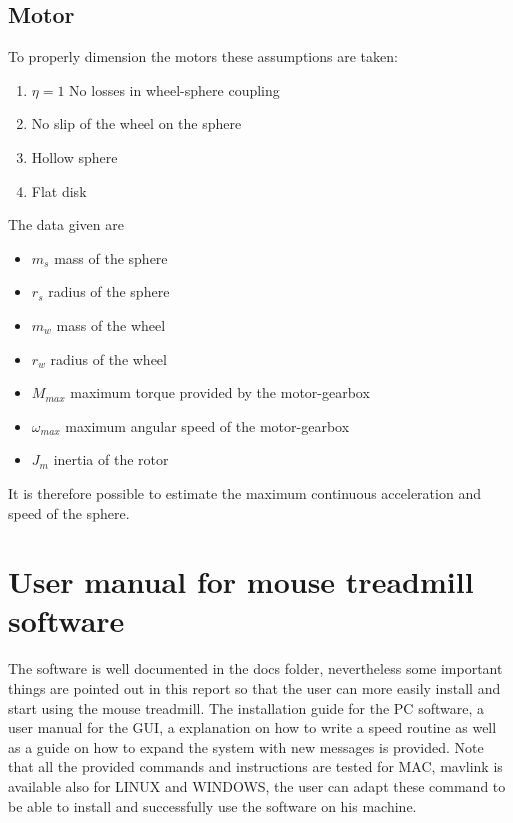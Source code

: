 \documentclass[12pt,a4paper]{article}
\begin{document}
\subsection{Motor}
To properly dimension the motors these assumptions are taken:
\begin{multicols}{2}[]
\begin{enumerate}
	\item $\eta = 1$ No losses in wheel-sphere coupling
	\item No slip of the wheel on the sphere
	\item Hollow sphere
	\item Flat disk
\end{enumerate}
\end{multicols}
The data given are
\begin{multicols}{2}[]
\begin{itemize}
	\item $m_s$ mass of the sphere
	\item $r_s$ radius of the sphere
	\item $m_w$ mass of the wheel
	\item $r_w$ radius of the wheel
	\item $M_{max}$ maximum torque provided by the motor-gearbox 
	\item $\omega_{max}$ maximum angular speed of the motor-gearbox
	\item $J_m$ inertia of the rotor
\end{itemize}
\end{multicols}
It is therefore possible to estimate the maximum continuous  acceleration and speed of the sphere.
\newpage
\section[User manual]{User manual for mouse treadmill software}
The software is well documented in the docs folder, nevertheless some important things are pointed out in this report so that the user can more easily install and start using the mouse treadmill. The installation guide for the PC software, a user manual for the GUI, a explanation on how to write a speed routine as well as a guide on how to expand the system with new messages is provided. Note that all the provided commands and instructions are tested for MAC, mavlink is available also for LINUX and WINDOWS, the user can adapt these command to be able to install and successfully use the software on his machine. 
\end{document}

